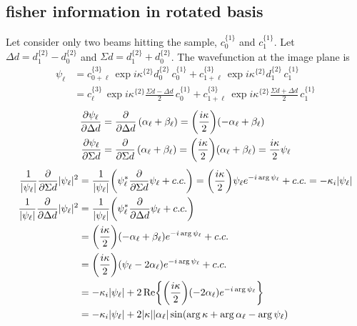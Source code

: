 \documentclass[12pt]{article}
\begin{document}
\subsection{fisher information in rotated basis}
Let consider only two beams hitting the sample, $c^{\{ 1 \}}_{0}$ and $c^{\{ 1 \}}_1$. 
Let $\Delta d = d^{\{ 2 \}}_1 - d^{\{ 2 \}}_0$ and 
$\Sigma d = d^{\{ 2 \}}_1 + d^{\{ 2 \}}_0$. The wavefunction at the image plane is
\begin{align*}
    \psi_\ell &= 
     c^{\{3\}}_{0 + \ell} \,
        \exp{i \kappa^{\{2\}} d^{\{2\}}_0} \,
        c^{\{1\}}_0 +
     c^{\{3\}}_{1 + \ell} \,
        \exp{i \kappa^{\{2\}} d^{\{2\}}_1} \,
        c^{\{1\}}_1 \\
    &= 
     c^{\{3\}}_{\ell} \,
        \exp{i \kappa^{\{2\}} \frac{\Sigma d - \Delta d}{2}} \,
        c^{\{1\}}_0 +
     c^{\{3\}}_{1 + \ell} \,
        \exp{i \kappa^{\{2\}} \frac{\Sigma d + \Delta d}{2}} \,
        c^{\{1\}}_1
\end{align*}
\begin{align*}
    \pdv{\psi_\ell}{\Delta d} &= 
        \pdv{\Delta d}\left( \alpha_\ell + \beta_\ell \right) 
        = \qty(\frac{i\kappa}{2})(-\alpha_\ell + \beta_\ell) \\
    \pdv{\psi_\ell}{\Sigma d} &= 
        \pdv{\Sigma d}\left( \alpha_\ell + \beta_\ell \right) 
        = \qty(\frac{i\kappa}{2})(\alpha_\ell + \beta_\ell)
        = \frac{i\kappa}{2} \psi_\ell
\end{align*}
\begin{align*}
    \frac{1}{|\psi_\ell|} \pdv{\Sigma d} |\psi_\ell|^2 &= 
    \frac{1}{|\psi_\ell|} \qty(\psi_\ell^* \pdv{\Sigma d} \psi_\ell + c.c.) 
    = \qty(\frac{i\kappa}{2})\psi_\ell e^{-i \arg{\psi_\ell}} + c.c. 
    = -\kappa_i |\psi_\ell| \\
    \frac{1}{|\psi_\ell|} \pdv{\Delta d} |\psi_\ell|^2 &=
    \frac{1}{|\psi_\ell|} \qty(\psi_\ell^* \pdv{\Delta d} \psi_\ell + c.c.) \\
        &= \qty(\frac{i\kappa}{2})(-\alpha_\ell + \beta_\ell)e^{-i \arg{\psi_\ell}} + c.c. \\
        &= \qty(\frac{i\kappa}{2})(\psi_\ell-2\alpha_\ell)e^{-i \arg{\psi_\ell}} + c.c. \\
        &= -\kappa_i |\psi_\ell| + 
            2 \Re{ \qty(\frac{i\kappa}{2})(-2\alpha_\ell)e^{-i \arg{\psi_\ell}}}\\
        &= -\kappa_i |\psi_\ell| + 2 |\kappa| 
            |\alpha_\ell| \sin(\arg{\kappa} + \arg{\alpha_\ell} - \arg{\psi_\ell})
\end{align*}
\end{document}
